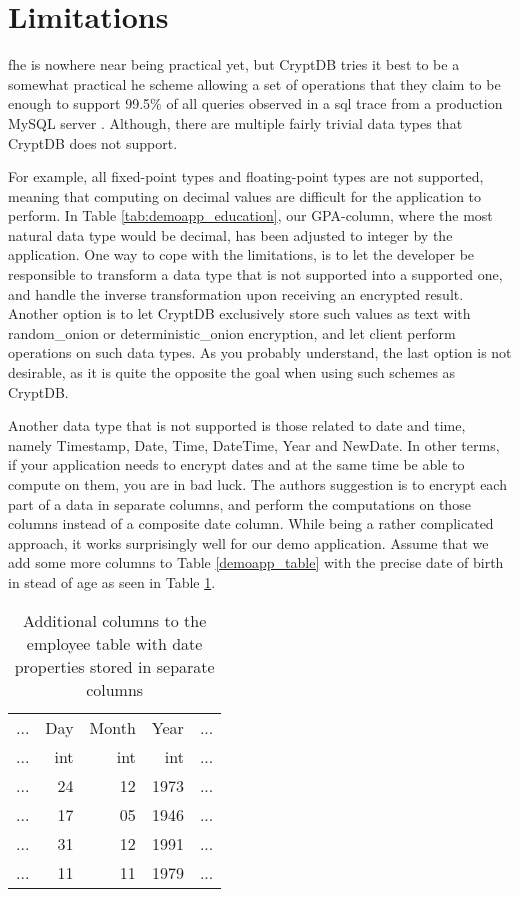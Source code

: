 \section{Limitations}

\gls{fhe} is nowhere near being practical yet, but CryptDB tries it best to be a somewhat practical \gls{he} scheme allowing a set of operations that they claim to be enough to support 99.5\% of all queries observed in a \gls{sql} trace from a production MySQL server \citep{CryptDB_Main_Paper}. Although, there are multiple fairly trivial data types that CryptDB does not support.

For example, all fixed-point types and floating-point types are not supported, meaning that computing on decimal values are difficult for the application to perform. In Table \ref{tab:demoapp_education}, our GPA-column, where the most natural data type would be decimal, has been adjusted to integer by the application. One way to cope with the limitations, is to let the developer be responsible to transform a data type that is not supported into a supported one, and handle the inverse transformation  upon receiving an encrypted result. Another option is to let CryptDB exclusively store such values as text with \gls{random_onion} or \gls{deterministic_onion} encryption, and let client perform operations on such data types. As you probably understand, the last option is not desirable, as it is quite the opposite the goal when using such schemes as CryptDB. 

Another data type that is not supported is those related to date and time, namely Timestamp, Date, Time, DateTime, Year and NewDate. In other terms, if your application needs to encrypt dates and at the same time be able to compute on them, you are in bad luck. The authors suggestion is to encrypt each part of a data in separate columns, and perform the computations on those columns instead of a composite date column. While being a rather complicated approach, it works surprisingly well for our demo application. Assume that we add some more columns to Table \ref{demoapp_table} with the precise date of birth in stead of age as seen in Table \ref{tab:empl_tab_mod}.

\begin{table}[H]
\centering
\begin{tabular}{| c | r | r | r | c |}
\hline
  ... & Day & Month & Year & ... \\
  ... & int & int & int & ... \\
 \hline \hline
 ... & 24 & 12 & 1973  & ... \\
 ... & 17 & 05 & 1946 & ... \\
 ... & 31 & 12 & 1991 & ... \\
 ... & 11 & 11 & 1979  & ... \\
 \hline
\end{tabular}
\caption{Additional columns to the employee table with date properties stored in separate columns}
\label{tab:empl_tab_mod}
\end{table}

